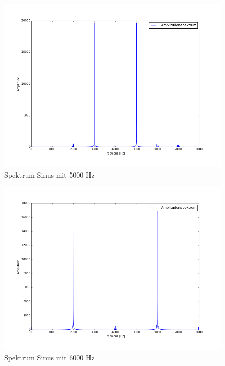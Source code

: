 \documentclass[12pt,oneside,a4paper]{report}
\begin{document}
\begin{figure}[H]
\centering\small
\includegraphics[scale=0.4]{src/5000fft.png}
\caption{Spektrum Sinus mit 5000 Hz}
\label{fig:5000_FFT}
\end{figure}

\begin{figure}[H]
\centering\small
\includegraphics[scale=0.4]{src/6000fft.png}
\caption{Spektrum Sinus mit 6000 Hz}
\label{fig:6000_FFT}
\end{figure}
\end{document}
